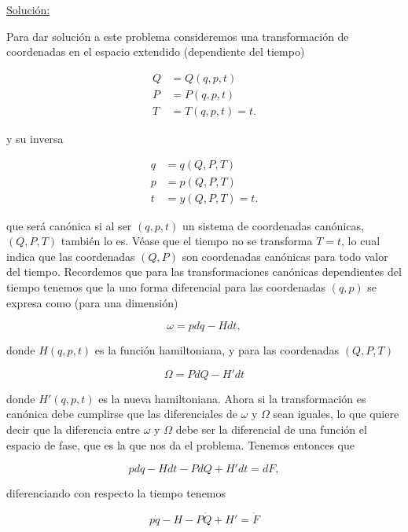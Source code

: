 \documentclass[a4paper,10pt]{article}
\numberwithin{equation}{section}
\begin{document}
\underline{Solución:} \vspace{.3cm}

Para dar solución a este problema consideremos una transformación de 
coordenadas en el espacio extendido (dependiente del tiempo) 

\begin{align*}
 Q &= Q(q,p,t) \\
 P &= P(q,p,t) \\
 T &= T(q,p,t) = t.
\end{align*}

y su inversa 

\begin{align*}
 q &= q(Q,P,T) \\
 p &= p(Q,P,T) \\
 t &= y(Q,P,T) = t.
\end{align*}

que será canónica si al ser $(q,p,t)$ un sistema de coordenadas canónicas, $(Q,P,T)$ 
también lo es. Véase que el tiempo no se transforma $T = t$, lo cual indica que 
las coordenadas $(Q,P)$ son coordenadas canónicas para todo valor del tiempo. Recordemos 
que para las transformaciones canónicas dependientes del tiempo tenemos que la 
uno forma diferencial para las coordenadas $(q,p)$ se expresa como (para una dimensión)

\begin{equation}
 \omega = pdq - Hdt,
\end{equation}

donde $H(q,p,t)$ es la función hamiltoniana, y para las coordenadas $(Q,P,T)$ 

\begin{equation}
 \Omega = PdQ - H'dt
\end{equation}

donde $H'(q,p,t)$ es la nueva hamiltoniana. Ahora si la transformación es canónica 
debe cumplirse que las diferenciales de $\omega$ y $\Omega$ sean iguales, lo que 
quiere decir que la diferencia entre $\omega$ y $\Omega$ debe ser la diferencial 
de una función el espacio de fase, que es la que nos da el problema. Tenemos entonces 
que 

\begin{equation}
 pdq - Hdt - PdQ + H'dt = dF,
\end{equation}

diferenciando con respecto la tiempo tenemos 

\begin{equation}
 p\dot{q} - H - P\dot{Q} + H' = \dot{F}
\end{equation}
\end{document}
